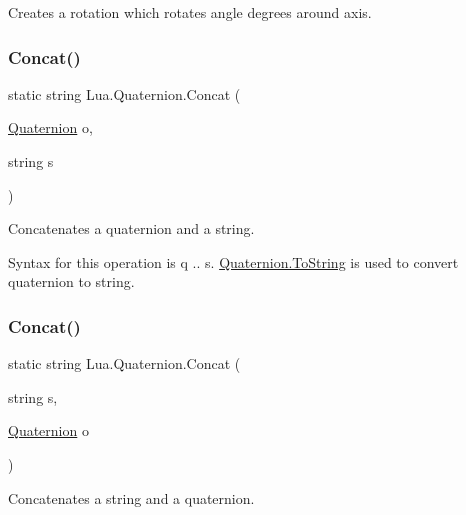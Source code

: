 Creates a rotation which rotates angle degrees around axis. 

\mbox{\label{class_lua_1_1_quaternion_ac70013482fc53c72c664561d67d5d677}} 
\subsubsection{\texorpdfstring{Concat()}{Concat()}\hspace{0.1cm}{\footnotesize\ttfamily [1/3]}}
{\footnotesize\ttfamily static string Lua.\+Quaternion.\+Concat (\begin{DoxyParamCaption}\item[{\mbox{\hyperlink{class_lua_1_1_quaternion}{Quaternion}}}]{o,  }\item[{string}]{s }\end{DoxyParamCaption})\hspace{0.3cm}{\ttfamily [static]}}



Concatenates a quaternion and a string. 

Syntax for this operation is {\ttfamily q .. s}. \mbox{\hyperlink{class_lua_1_1_quaternion_a72a4b219c3442e088c7ee963feb1b372}{Quaternion.\+To\+String}} is used to convert quaternion to string. \mbox{\label{class_lua_1_1_quaternion_a9eab1ab6fc89906ecc0b8159c1429a04}} 
\subsubsection{\texorpdfstring{Concat()}{Concat()}\hspace{0.1cm}{\footnotesize\ttfamily [2/3]}}
{\footnotesize\ttfamily static string Lua.\+Quaternion.\+Concat (\begin{DoxyParamCaption}\item[{string}]{s,  }\item[{\mbox{\hyperlink{class_lua_1_1_quaternion}{Quaternion}}}]{o }\end{DoxyParamCaption})\hspace{0.3cm}{\ttfamily [static]}}



Concatenates a string and a quaternion. 

